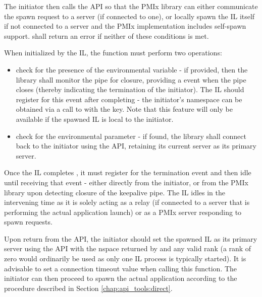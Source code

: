 The initiator then calls the  \ac{API} so that the \ac{PMIx} library can either communicate the spawn request to a server (if connected to one), or locally spawn the \ac{IL} itself if not connected to a server and the \ac{PMIx} implementation includes self-spawn support.  shall return an error if neither of these conditions is met.

When initialized by the \ac{IL}, the  function must perform two operations:

\begin{itemize}
    \item check for the presence of the  environmental variable - if provided, then the library shall monitor the pipe for closure, providing a  event when the pipe closes (thereby indicating the termination of the initiator). The \ac{IL} should register for this event after completing  - the initiator's namespace can be obtained via a call to  with the  key. Note that this feature will only be available if the spawned \ac{IL} is local to the initiator.
    \item check for the  environmental parameter - if found, the library shall connect back to the initiator using the  \ac{API}, retaining its current server as its primary server.
\end{itemize}

Once the \ac{IL} completes , it must register for the  termination event and then idle until receiving that event - either directly from the initiator, or from the \ac{PMIx} library upon detecting closure of the keepalive pipe. The \ac{IL} idles in the intervening time as it is solely acting as a relay (if connected to a server that is performing the actual application launch) or as a \ac{PMIx} server responding to spawn requests.

Upon return from the  \ac{API}, the initiator should set the spawned \ac{IL} as its primary server using the  \ac{API} with the nspace returned by  and any valid rank (a rank of zero would ordinarily be used as only one \ac{IL} process is typically started). It is advisable to set a connection timeout value when calling this function. The initiator can then proceed to spawn the actual application according to the procedure described in Section \ref{chap:api_tools:direct}.

